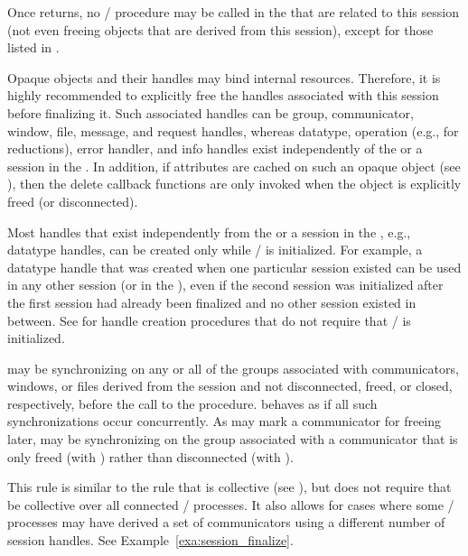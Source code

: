 Once  returns, no \MPI/ procedure may be called in the \spm{} that are related to this session
(not even freeing objects that are derived from this session),
except for those listed in .

\begin{users}
Opaque objects and their handles may bind internal resources.
Therefore, it is highly recommended to explicitly free the handles associated with this session before finalizing it.
Such associated handles can be group, communicator, window, file, message, and request handles,
whereas datatype, operation (e.g., for reductions), error handler, and info handles exist independently
of the \wpm{} or a session in the \spm{}.
In addition, if attributes are cached on such an opaque object (see ),
then the delete callback functions are only invoked when the object is explicitly freed (or disconnected).
\end{users}

Most handles that exist independently from the \wpm{} or a session in the \spm{}, e.g., datatype handles,
can be created only while \MPI/ is initialized.
For example, a datatype handle that was created when one particular session existed
can be used in any other session (or in the \wpm{}), even if the second session
was initialized after the first session had already been finalized
and no other session existed in between.
See  for handle creation procedures that do not require that \MPI/ is initialized.

 may be synchronizing on any or all of the groups associated with
communicators, windows, or files derived from the session and not disconnected, freed, or closed,
respectively, before the call to the  procedure.
 behaves as if all such synchronizations occur concurrently.
As  may mark a communicator for freeing later,
 may be synchronizing on the group associated
with a communicator that is only freed (with )
rather than disconnected (with ).

\begin{rationale}
This rule is similar to the rule that  is collective (see ),
but does not require that  be collective over all connected \MPI/ processes.
It also allows for cases where some \MPI/ processes may have derived a set of communicators
using a different number of session handles.  See Example~\ref{exa:session_finalize}.
\end{rationale}

